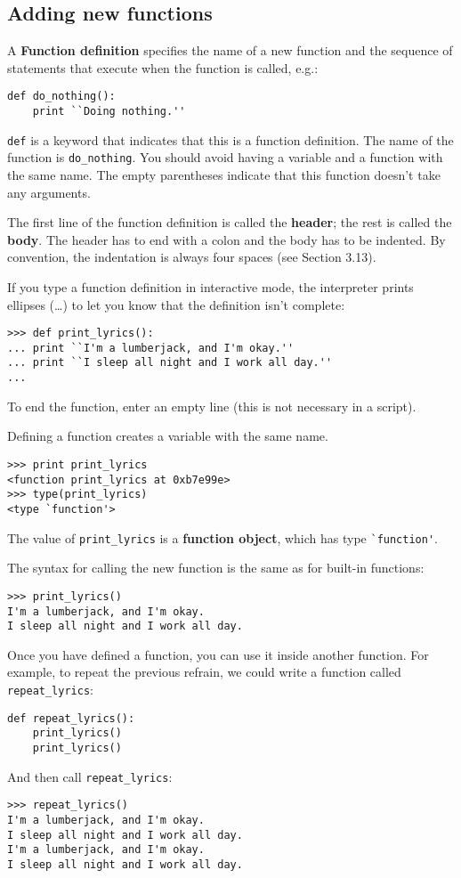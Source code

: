 \documentclass{article}
\begin{document}
\subsection{Adding new functions}
A \textbf{Function definition} specifies the name of a new
function and the sequence of statements that execute when the
function is called, e.g.:
\begin{verbatim}
def do_nothing():
    print ``Doing nothing.''
\end{verbatim}

\verb|def| is a keyword that indicates that this is a function
definition. The name of the function is \verb|do_nothing|.
You should avoid having a variable and a function with the same
name. The empty parentheses indicate that this function doesn't
take any arguments.

The first line of the function definition is called the
\textbf{header}; the rest is called the \textbf{body}. The header
has to end with a colon and the body has to be indented.
By convention, the indentation is always four spaces
(see Section 3.13).

If you type a function definition in interactive mode, the interpreter
prints ellipses (\ldots) to let you
know that the definition isn't complete:
\begin{verbatim}
>>> def print_lyrics():
... print ``I'm a lumberjack, and I'm okay.''
... print ``I sleep all night and I work all day.''
...
\end{verbatim}
To end the function, enter an empty line (this is not
necessary in a script).

Defining a function creates a variable with the same name.
\begin{verbatim}
>>> print print_lyrics
<function print_lyrics at 0xb7e99e>
>>> type(print_lyrics)
<type `function'>
\end{verbatim}
The value of \verb|print_lyrics| is a \textbf{function object},
which has type \verb|`function'|.

The syntax for calling the new function is the same as for
built-in functions:
\begin{verbatim}
>>> print_lyrics()
I'm a lumberjack, and I'm okay.
I sleep all night and I work all day.
\end{verbatim}
Once you have defined a function, you can use it inside another
function. For example, to repeat the previous refrain, we could write
a function called \verb|repeat_lyrics|:
\begin{verbatim}
def repeat_lyrics():
    print_lyrics()
    print_lyrics()
\end{verbatim}
And then call \verb|repeat_lyrics|:
\begin{verbatim}
>>> repeat_lyrics()
I'm a lumberjack, and I'm okay.
I sleep all night and I work all day.
I'm a lumberjack, and I'm okay.
I sleep all night and I work all day.
\end{verbatim}
\end{document}
